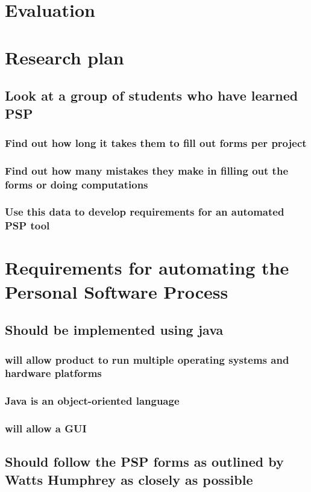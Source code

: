\chapter{Evaluation}
\chapter{Research plan}
\section{Look at a group of students who have learned PSP}
\subsection{Find out how long it takes them to fill out forms per project}
\subsection{Find out how many mistakes they make in filling out the forms or doing computations}
\subsection{Use this data to develop requirements for an automated PSP tool}
\chapter{Requirements for automating the Personal Software Process}
\section{Should be implemented using java}
\subsection{will allow product to run multiple operating systems and
hardware platforms}
\subsection{Java is an object-oriented language}
\subsection{will allow a GUI}
\section{Should follow the PSP forms as outlined by Watts Humphrey as
closely as possible}
